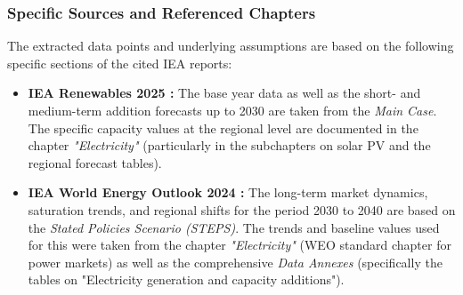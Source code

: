 \documentclass[11pt,a4paper]{article}
\begin{document}
\subsubsection{Specific Sources and Referenced Chapters}
The extracted data points and underlying assumptions are based on the following specific sections of the cited IEA reports:

\begin{itemize}
    \item \textbf{IEA Renewables 2025 \cite{iea_renewables_2025}:} 
    The base year data as well as the short- and medium-term addition forecasts up to 2030 are taken from the \textit{Main Case}. The specific capacity values at the regional level are documented in the chapter \textit{"Electricity"} (particularly in the subchapters on solar PV and the regional forecast tables).
    
    \item \textbf{IEA World Energy Outlook 2024 \cite{iea_weo_2024}:} 
    The long-term market dynamics, saturation trends, and regional shifts for the period 2030 to 2040 are based on the \textit{Stated Policies Scenario (STEPS)}. The trends and baseline values used for this were taken from the chapter \textit{"Electricity"} (WEO standard chapter for power markets) as well as the comprehensive \textit{Data Annexes} (specifically the tables on "Electricity generation and capacity additions").
\end{itemize}






\end{document}
